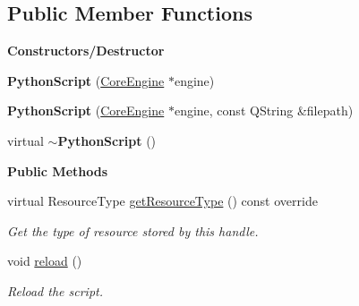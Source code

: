 \subsection*{Public Member Functions}
\begin{Indent}\textbf{ Constructors/\+Destructor}\par
\begin{DoxyCompactItemize}
\item 
\mbox{\label{classrev_1_1_python_script_a49660deecce1e323345562241de4edde}} 
{\bfseries Python\+Script} (\mbox{\hyperlink{classrev_1_1_core_engine}{Core\+Engine}} $\ast$engine)
\item 
\mbox{\label{classrev_1_1_python_script_a91f136102e4391e606885f2518c4c51e}} 
{\bfseries Python\+Script} (\mbox{\hyperlink{classrev_1_1_core_engine}{Core\+Engine}} $\ast$engine, const Q\+String \&filepath)
\item 
\mbox{\label{classrev_1_1_python_script_a66306640292c3006bef369519627fc42}} 
virtual {\bfseries $\sim$\+Python\+Script} ()
\end{DoxyCompactItemize}
\end{Indent}
\begin{Indent}\textbf{ Public Methods}\par
\begin{DoxyCompactItemize}
\item 
\mbox{\label{classrev_1_1_python_script_ad5385fde8c840e080a5d312792adc887}} 
virtual Resource\+Type \mbox{\hyperlink{classrev_1_1_python_script_ad5385fde8c840e080a5d312792adc887}{get\+Resource\+Type}} () const override
\begin{DoxyCompactList}\small\item\em Get the type of resource stored by this handle. \end{DoxyCompactList}\item 
\mbox{\label{classrev_1_1_python_script_a688cec18663b61c1604b1716a44a9a13}} 
void \mbox{\hyperlink{classrev_1_1_python_script_a688cec18663b61c1604b1716a44a9a13}{reload}} ()
\begin{DoxyCompactList}\small\item\em Reload the script. \end{DoxyCompactList}\end{DoxyCompactItemize}
\end{Indent}
